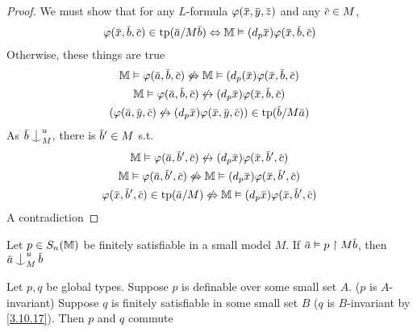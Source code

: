 \documentclass[11pt]{article}
\begin{document}
\begin{proof}
We must show that for any \(L\)-formula \(\varphi(\barx,\bary,\barz)\) and any \(\barc\in M\),
\begin{equation*}
\varphi(\barx,\barb,\barc)\in\tp(\bara/M\barb)\Leftrightarrow\M\vDash(d_p\barx)\varphi(\barx,\barb,\barc)
\end{equation*}
Otherwise, these things are true
\begin{gather*}
\M\vDash\varphi(\bara,\barb,\barc)\not\Leftrightarrow\M\vDash(d_p(\barx)\varphi(\barx,\barb,\barc)\\
\M\vDash\varphi(\bara,\barb,\barc)\not\leftrightarrow(d_p\barx)\varphi(\barx,\barb,\barc)\\
(\varphi(\bara,\bary,\barc)\not\leftrightarrow(d_p\barx)\varphi(\barx,\bary,\barc))\in\tp(\barb/M\bara)
\end{gather*}
As \(\barb\ind_M^u\), there is \(\barb'\in M\) s.t.
\begin{gather*}
\M\vDash\varphi(\bara,\barb',\barc)\not\leftrightarrow(d_p\barx)\varphi(\barx,\barb',\barc)\\
\M\vDash\varphi(\bara,\barb',\barc)\not\Leftrightarrow\M\vDash(d_p\barx)\varphi(\barx,\barb',\barc)\\
\varphi(\barx,\barb',\barc)\in\tp(\bara/M)\not\Leftrightarrow\M\vDash(d_p\barx)\varphi(\barx,\barb',\barc)
\end{gather*}
A contradiction
\end{proof}

\begin{lemma}[]
\label{ci2.2}
Let \(p\in S_n(\mathbb{M})\) be finitely satisfiable in a small model \(M\). If \(\bara\vDash p\uhr M\barb\),
then \(\bara\ind_M^u\barb\)
\end{lemma}

\begin{theorem}[]
\label{ci2.3}
Let \(p,q\) be global types. Suppose \(p\) is definable over some small set \(A\). (\(p\)
is \(A\)-invariant) Suppose \(q\) is finitely satisfiable in some small set \(B\) (\(q\)
is \(B\)-invariant by \ref{3.10.17}). Then \(p\) and \(q\) commute
\end{theorem}
\end{document}
